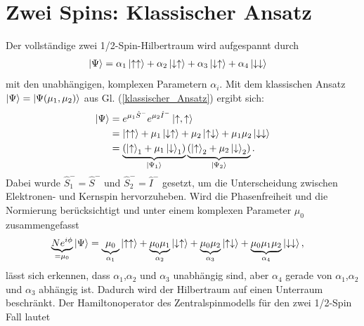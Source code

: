 











\section{Zwei Spins: Klassischer Ansatz}
Der vollständige zwei 1/2-Spin-Hilbertraum wird aufgespannt durch
\begin{align}
    \ket{\Psi} &= \alpha_1\ket{\uparrow\uparrow} + \alpha_2 \ket{\downarrow\uparrow} + \alpha_3\ket{\downarrow\uparrow} + \alpha_4\ket{\downarrow\downarrow}
\end{align}
mit den unabhängigen, komplexen Parametern $\alpha_i$.
\noindent Mit dem klassischen Ansatz $\ket{\Psi} = \ket{\Psi(\mu_1, \mu_2)}$ aus Gl. (\ref{klassischer_Ansatz}) ergibt sich: 
\begin{align}
    \ket{\Psi} &= e^{\mu_1 \hat{S}^{-}}e^{\mu_2 \hat{I}^{-}}\ket{\uparrow,\uparrow} \nonumber\\
                &= \ket{\uparrow \uparrow} +\mu_1\ket{\downarrow \uparrow} + \mu_2\ket{\uparrow \downarrow} + \mu_1\mu_2\ket{\downarrow\downarrow}\nonumber\\
                &= \underbrace{\left(\ket{\uparrow}_1 + \mu_1\ket{\downarrow}_1\right)}_{\ket{\Psi_1}}\underbrace{\left(\ket{\uparrow}_2 + \mu_2\ket{\downarrow}_2\right)}_{\ket{\Psi_2}}  .
\end{align}
Dabei wurde $\hat{S}_1^{-} = \hat{S}^{-}$ und $\hat{S}_2^{-} = \hat{I}^{-}$ gesetzt, um die Unterscheidung zwischen Elektronen- und Kernspin hervorzuheben.
Wird die Phasenfreiheit und die Normierung berücksichtigt und unter einem komplexen Parameter $\mu_0$ zusammengefasst
\begin{align}\label{ueberlapp_klassisch}
    \underbrace{Ne^{i\phi}}_{=\mu_0}\ket{\Psi} &= \underbrace{\mu_0}_{\alpha_1}\ket{\uparrow \uparrow} 
    + \underbrace{\mu_0\mu_1}_{\alpha_2}\ket{\downarrow \uparrow} + \underbrace{\mu_0\mu_2}_{\alpha_3}\ket{\uparrow \downarrow} 
    + \underbrace{\mu_0\mu_1\mu_2}_{\alpha_4}\ket{\downarrow\downarrow},
\end{align}
lässt sich erkennen, dass $\alpha_1$,$\alpha_2$ und $\alpha_3$ unabhängig sind, aber $\alpha_4$ gerade 
von $\alpha_1$,$\alpha_2$ und $\alpha_3$ abhängig ist. Dadurch wird der Hilbertraum auf einen Unterraum beschränkt. Der Hamiltonoperator 
des Zentralspinmodells für den zwei 1/2-Spin Fall lautet
